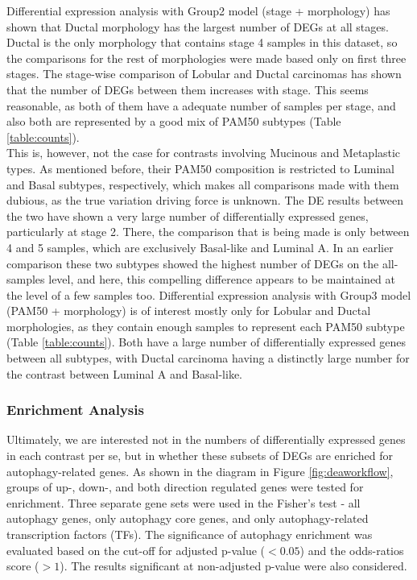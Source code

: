         Differential expression analysis with Group2 model (stage + morphology) has shown that Ductal morphology has the largest number of DEGs at all stages. Ductal is the only morphology that contains stage 4 samples in this dataset, so the comparisons for the rest of morphologies were made based only on first three stages. The stage-wise comparison of Lobular and Ductal carcinomas has shown that the number of DEGs between them increases with stage. This seems reasonable, as both of them have a adequate number of samples per stage, and also both are represented by a good mix of PAM50 subtypes (Table \ref{table:counts}). \\ This is, however, not the case for contrasts involving Mucinous and Metaplastic types. As mentioned before, their PAM50 composition is restricted to Luminal and Basal subtypes, respectively, which makes all comparisons made with them dubious, as the true variation driving force is unknown. The DE results between the two have shown a very large number of differentially expressed genes, particularly at stage 2. There, the comparison that is being made is only between 4 and 5 samples, which are exclusively Basal-like and Luminal A. In an earlier comparison these two subtypes showed the highest number of DEGs on the all-samples level, and here, this compelling difference appears to be maintained at the level of a few samples too. 
        \newpage
        Differential expression analysis with Group3 model (PAM50 + morphology) is of interest mostly only for Lobular and Ductal morphologies, as they contain enough samples to represent each PAM50 subtype (Table \ref{table:counts}). Both have a large number of differentially expressed genes between all subtypes, with Ductal carcinoma having a distinctly large number for the contrast between Luminal A and Basal-like.  \\

        \subsubsection{Enrichment Analysis}
        
        Ultimately, we are interested not in the numbers of differentially expressed genes in each contrast per se, but in whether these subsets of DEGs are enriched for autophagy-related genes. As shown in the diagram in Figure \ref{fig:deaworkflow}, groups of up-, down-, and both direction regulated genes were tested for enrichment. Three separate gene sets were used in the Fisher’s test - all autophagy genes, only autophagy core genes, and only autophagy-related transcription factors (TFs). The significance of autophagy enrichment was evaluated based on the cut-off for adjusted p-value ($<0.05$) and the odds-ratios score ($>1$). The results significant at non-adjusted p-value were also considered.

